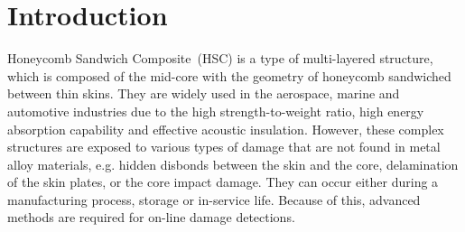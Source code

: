 \documentclass[materials,article,submit,moreauthors,pdftex]{Definitions/mdpi}
\begin{document}
\section{Introduction}
\label{sec:intro}
Honeycomb Sandwich Composite~(HSC) is a type of multi-layered structure, which is composed of the mid-core with the geometry of honeycomb sandwiched between thin skins.
They are widely used in the aerospace, marine and automotive industries due to the high strength-to-weight ratio, high energy absorption capability and effective acoustic insulation.
However, these complex structures are exposed to various types of damage that are not found in metal alloy materials, e.g. hidden disbonds between the skin and the core, delamination of the skin plates, or the core impact damage.
They can occur either during a manufacturing process, storage or in-service life.
Because of this, advanced methods are required for on-line damage detections.
\end{document}

